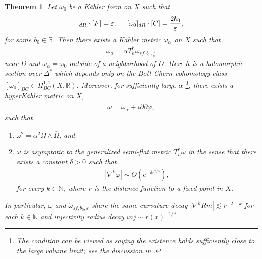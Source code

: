 \documentclass[11pt]{amsart}
\theoremstyle{plain}
\newtheorem{thm}{Theorem}[section]
\theoremstyle{definition}
\numberwithin{equation}{section}
\renewcommand{\epsilon}{\varepsilon}
\renewcommand{\phi}{\varphi}
\begin{document}
   \begin{thm} \cite[Theorem 2.16]{CJL2} \label{generalized Hein's metric} 
   	Let ${\omega}_0$ be a K\"ahler form on $X$ such that 
   	\begin{align*}
   		[{\omega}_0]_{dR}\cdot [F]=\epsilon, \hspace{5mm} [{\omega}_0]_{dR} \cdot [C]=\frac{2b_0}{\epsilon},
   	\end{align*} for some $b_0\in \mathbb{R}$. Then there exists a K\"ahler metric ${\omega}_{\alpha}$ on ${X}$ such that 
   	\begin{align*}
   		{\omega}_{\alpha}= \alpha T^*_{h}{\omega}_{sf,b_0,\frac{\epsilon}{\alpha}}
   	\end{align*} near ${D}$ and ${\omega}_{\alpha}={\omega}_0$ outside of a neighborhood of ${D}$. Here $h$ is a holomorphic section over $\Delta^*$ which depends only on the Bott-Chern cohomology class $[{\omega}_0]_{BC} \in H^{1,1}_{BC}(X, \mathbb{R})$. Moreover, for sufficiently large $\alpha$ \footnote{The condition can be viewed as saying the existence holds sufficiently close to  the large volume limit; see the discussion in \cite[Section 5]{CJL2}.}, there exists a hyperK\"ahler metric on ${X}$,
   	\begin{align*}
   		{\omega}={\omega}_{\alpha}
   		+i\partial \bar{\partial} \phi, 
   	\end{align*} such that 
   	\begin{enumerate}
   		\item  ${\omega}^2=\alpha^2{\Omega}\wedge \bar{{\Omega}}$, and
   		\item ${\omega}$ is asymptotic to the generalized semi-flat metric $T^*_h{\omega}$ in the sense that there exists a constant $\delta>0$ such that 
   		\begin{align*}
   			|\nabla^k \phi|\sim O(e^{-\delta r^{2/3}}),
   		\end{align*} for every $k\in \mathbb{N}$, where $r$ is the distance function to a fixed point in ${X}$. 
   	\end{enumerate}
   	In particular, $\check{\omega}$ and $\check{\omega}_{sf,b_0,\epsilon}$ share the same curvature decay $|\nabla^k Rm|\lesssim r^{-2-k}$ for each $k\in \mathbb{N}$ and injectivity radius decay $inj\sim r(x)^{-1/3}$. 
   \end{thm}
   
\end{document}
